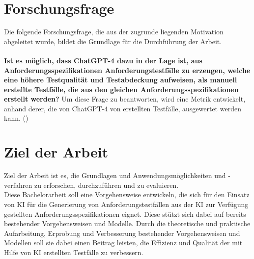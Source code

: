 \documentclass[12pt,toc=bib,toc=listof]{scrreprt}
\begin{document}
\section{Forschungsfrage} %
\label{sec:forschungsfrage}
Die folgende Forschungsfrage, die aus der zugrunde liegenden Motivation abgeleitet wurde, bildet die Grundlage für die Durchführung der Arbeit.\\
\\
\textbf{Ist es möglich, dass ChatGPT-4 dazu in der Lage ist, aus Anforderungsspezifikationen Anforderungstestfälle zu erzeugen, welche eine höhere Testqualität und Testabdeckung aufweisen, als manuell erstellte Testfälle, die aus den gleichen Anforderungsspezifikationen erstellt werden?}  Um diese Frage zu beantworten, wird eine Metrik entwickelt, anhand derer, die von ChatGPT-4 von erstellten Testfälle, ausgewertet werden kann. (\cite{OpenAI2025})

\section{Ziel der Arbeit} %
\label{sec:zielDerArbeit}
Ziel der Arbeit ist es, die Grundlagen und Anwendungsmöglichkeiten und -verfahren zu erforschen, durchzuführen und zu evaluieren.\\
Diese Bachelorarbeit soll eine Vorgehensweise entwickeln, die sich für den Einsatz von KI für die Generierung von Anforderungstestfällen aus der KI zur Verfügung gestellten Anforderungsspezifikationen eignet. Diese stützt sich dabei auf bereits bestehender Vorgehensweisen und Modelle. Durch die theoretische und praktische Aufarbeitung, Erprobung und Verbesserung bestehender Vorgehensweisen und Modellen soll sie dabei einen Beitrag leisten, die Effizienz und Qualität der mit Hilfe von KI erstellten Testfälle zu verbessern.
\end{document}
